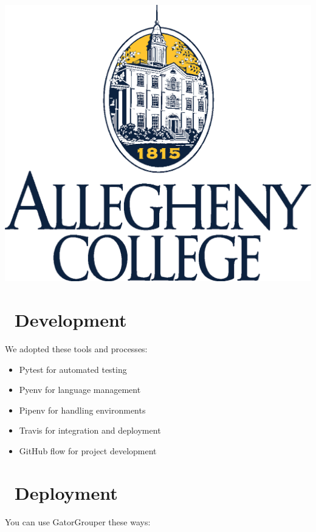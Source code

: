 \documentclass[a0paper,fleqn]{betterposter}
\begin{document}
{  \includegraphics[width=\textwidth]{img/CollegeLogo.eps}\\

  }{


  \vspace*{-.5in}
  \section{\faCodeFork~Development}
  We adopted these tools and processes:\\
  \vspace*{-.5in}
  \begin{itemize}[leftmargin=*]

    \item{Pytest for automated testing}
    \item{Pyenv for language management}
    \item{Pipenv for handling environments}
    \item{Travis for integration and deployment}
    \item{GitHub flow for project development}

  \end{itemize}

  \section{\faCloudUpload~Deployment}
  You can use GatorGrouper these ways:\\
  \vspace*{-.5in}
  \begin{itemize}[leftmargin=*]


\end{itemize}}
\end{document}
